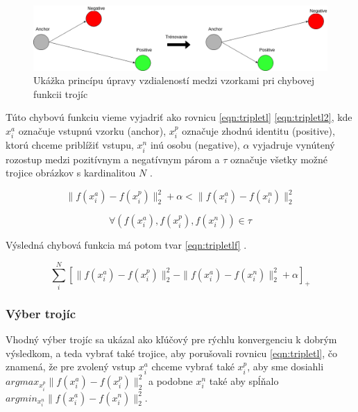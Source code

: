 \begin{figure}[H]
	\centering
	\includegraphics[width=0.75\linewidth]{img/triplet}
	\caption{Ukážka princípu úpravy vzdialeností medzi vzorkami pri chybovej funkcii trojíc}
	\label{fig:triplet}
\end{figure}

Túto chybovú funkciu vieme vyjadriť ako rovnicu \eqref{eqn:tripletl} \eqref{eqn:tripletl2}, kde $x_{i}^a$ označuje vstupnú vzorku (anchor), $x_{i}^p$ označuje zhodnú identitu (positive), ktorú chceme priblížiť vstupu,
$x_{i}^n$ inú osobu (negative), $\alpha$ vyjadruje vynútený rozostup medzi pozitívnym a negatívnym párom a $\tau$ označuje všetky možné trojice obrázkov s kardinalitou $ N $ \cite{schroff2015facenet}.

\begin{equation}\label{eqn:tripletl}
\parallel f(x_{i}^a) - f(x_{i}^p) \parallel_{2}^2 + \alpha <
\parallel f(x_{i}^a) - f(x_{i}^n)\parallel_{2}^2
\end{equation}

\begin{equation}\label{eqn:tripletl2}
\forall (f(x_{i}^a), f(x_{i}^p), f(x_{i}^n)) \in \tau
\end{equation}

\indent Výsledná chybová funkcia má potom tvar \eqref{eqn:tripletlf} \cite{schroff2015facenet}.

\begin{equation}\label{eqn:tripletlf}
\sum \limits_{i}^N [
\parallel f(x_{i}^a) - f(x_{i}^p) \parallel_{2}^2 -
\parallel f(x_{i}^a) - f(x_{i}^n) \parallel_{2}^2 + \alpha 
]_{+}
\end{equation} 

\subsubsection{Výber trojíc}
Vhodný výber trojíc sa ukázal ako kľúčový pre rýchlu konvergenciu k dobrým výsledkom, a teda
vybrať také trojice, aby porušovali rovnicu \eqref{eqn:tripletl}, čo znamená, že pre zvolený vstup
$x_{i}^a$ chceme vybrať také $x_{i}^p$, aby sme dosiahli $argmax_{x_{i}^p}\parallel f(x_{i}^a) - f(x_{i}^p) \parallel_{2}^2$ a podobne $x_{i}^n$ také aby spĺňalo $argmin_{x_{i}^n}\parallel f(x_{i}^a) - f(x_{i}^n) \parallel_{2}^2$. 

